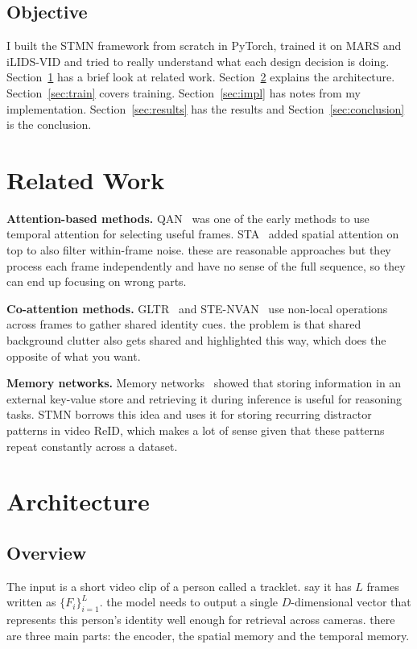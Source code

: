 \documentclass[conference]{IEEEtran}
\begin{document}
\subsection*{Objective}
I built the STMN framework from scratch in PyTorch, trained it on MARS and iLIDS-VID and tried to really understand what each design decision is doing. Section~\ref{sec:related} has a brief look at related work. Section~\ref{sec:arch} explains the architecture. Section~\ref{sec:train} covers training. Section~\ref{sec:impl} has notes from my implementation. Section~\ref{sec:results} has the results and Section~\ref{sec:conclusion} is the conclusion.

\section{Related Work}
\label{sec:related}

\textbf{Attention-based methods.} QAN~\cite{liu2017qan} was one of the early methods to use temporal attention for selecting useful frames. STA~\cite{fu2019sta} added spatial attention on top to also filter within-frame noise. these are reasonable approaches but they process each frame independently and have no sense of the full sequence, so they can end up focusing on wrong parts.

\textbf{Co-attention methods.} GLTR~\cite{li2019gltr} and STE-NVAN~\cite{liu2019ste} use non-local operations across frames to gather shared identity cues. the problem is that shared background clutter also gets shared and highlighted this way, which does the opposite of what you want.

\textbf{Memory networks.} Memory networks~\cite{sukhbaatar2015end} showed that storing information in an external key-value store and retrieving it during inference is useful for reasoning tasks. STMN borrows this idea and uses it for storing recurring distractor patterns in video ReID, which makes a lot of sense given that these patterns repeat constantly across a dataset.

\section{Architecture}
\label{sec:arch}

\subsection{Overview}

The input is a short video clip of a person called a tracklet. say it has $L$ frames written as $\{F_i\}_{i=1}^{L}$. the model needs to output a single $D$-dimensional vector that represents this person's identity well enough for retrieval across cameras. there are three main parts: the encoder, the spatial memory and the temporal memory.
\end{document}
